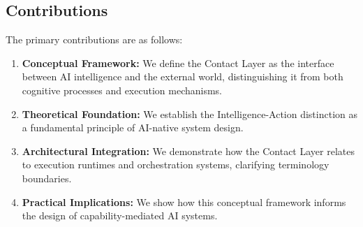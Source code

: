 \subsection{Contributions}
The primary contributions are as follows:
\begin{enumerate}[label=\arabic*.]
\item \textbf{Conceptual Framework:} We define the Contact Layer as the interface between AI intelligence and the external world, distinguishing it from both cognitive processes and execution mechanisms.

\item \textbf{Theoretical Foundation:} We establish the Intelligence-Action distinction as a fundamental principle of AI-native system design.

\item \textbf{Architectural Integration:} We demonstrate how the Contact Layer relates to execution runtimes and orchestration systems, clarifying terminology boundaries.

\item \textbf{Practical Implications:} We show how this conceptual framework informs the design of capability-mediated AI systems.
\end{enumerate}
